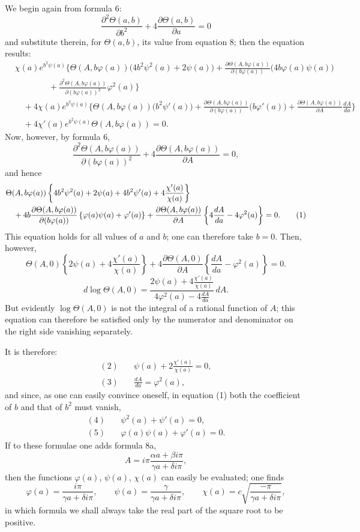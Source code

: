 \documentclass[10pt]{article}
\newcommand{\dd}{\partial}
\newcommand{\sourceanchor}[1]{\hypertarget{source-#1}{}}
\begin{document}
We begin again from formula 6:
\[
\frac{\dd^{2}\Theta(a,b)}{\dd b^{2}}+4\frac{\dd\Theta(a,b)}{\dd a}=0
\]
and substitute therein, for \(\Theta(a,b)\), its value from equation 8; then the equation results:
\begin{align*}
&\chi(a)e^{b^{2}\psi(a)}\Biggl\{\Theta(A,b\varphi(a))\bigl(4b^{2}\psi^{2}(a)+2\psi(a)\bigr)
+\frac{\dd\Theta(A,b\varphi(a))}{\dd(b\varphi(a))}\bigl(4b\varphi(a)\psi(a)\bigr)\\
&\qquad\qquad
+\frac{\dd^{2}\Theta(A,b\varphi(a))}{\dd(b\varphi(a))^{2}}\varphi^{2}(a)\Biggr\}\\
&\quad+4\chi(a)e^{b^{2}\psi(a)}\Biggl\{\Theta(A,b\varphi(a))\bigl(b^{2}\psi'(a)\bigr)
+\frac{\dd\Theta(A,b\varphi(a))}{\dd(b\varphi(a))}\bigl(b\varphi'(a)\bigr)
+\frac{\dd\Theta(A,b\varphi(a))}{\dd A}\frac{dA}{da}\Biggr\}\\
&\quad+4\chi'(a)e^{b^{2}\psi(a)}\Theta(A,b\varphi(a))=0.
\end{align*}
Now, however, by formula 6,
\[
\frac{\dd^{2}\Theta(A,b\varphi(a))}{\dd(b\varphi(a))^{2}}+4\frac{\dd\Theta(A,b\varphi(a))}{\dd A}=0,
\]
and hence
\sourceanchor{PA10}
\begin{align}
&\Theta(A,b\varphi(a))\left\{4b^{2}\psi^{2}(a)+2\psi(a)+4b^{2}\psi'(a)+4\frac{\chi'(a)}{\chi(a)}\right\} \notag\\
&\quad+4b\frac{\dd\Theta(A,b\varphi(a))}{\dd(b\varphi(a))}\left\{\varphi(a)\psi(a)+\varphi'(a)\right\}
+\frac{\dd\Theta(A,b\varphi(a))}{\dd A}\left\{4\frac{dA}{da}-4\varphi^{2}(a)\right\}=0. \tag{1}
\end{align}
This equation holds for all values of \(a\) and \(b\); one can therefore take \(b=0\). Then, however,
\[
\Theta(A,0)\left\{2\psi(a)+4\frac{\chi'(a)}{\chi(a)}\right\}+4\frac{\dd\Theta(A,0)}{\dd A}\left\{\frac{dA}{da}-\varphi^{2}(a)\right\}=0.
\]
\[
d\log\Theta(A,0)=\frac{2\psi(a)+4\frac{\chi'(a)}{\chi(a)}}{4\varphi^{2}(a)-4\frac{dA}{da}}\,dA.
\]
But evidently \(\log\Theta(A,0)\) is not the integral of a rational function of \(A\); this equation can therefore be satisfied only by the numerator and denominator on the right side vanishing separately.

It is therefore:
\begin{align*}
(2)\quad&\psi(a)+2\frac{\chi'(a)}{\chi(a)}=0,\\
(3)\quad&\frac{dA}{da}=\varphi^{2}(a),
\end{align*}
and since, as one can easily convince oneself, in equation (1) both the coefficient of \(b\) and that of \(b^{2}\) must vanish,
\begin{align*}
(4)\quad&\psi^{2}(a)+\psi'(a)=0,\\
(5)\quad&\varphi(a)\psi(a)+\varphi'(a)=0.
\end{align*}
If to these formulae one adds formula 8a,
\[
A=i\pi\frac{\alpha a+\beta i\pi}{\gamma a+\delta i\pi},
\]
then the functions \(\varphi(a)\), \(\psi(a)\), \(\chi(a)\) can easily be evaluated; one finds
\[
\varphi(a)=\frac{i\pi}{\gamma a+\delta i\pi},
\qquad
\psi(a)=\frac{\gamma}{\gamma a+\delta i\pi},
\qquad
\chi(a)=c\sqrt{\frac{-\pi}{\gamma a+\delta i\pi}},
\]
in which formula we shall always take the real part of the square root to be positive.
\end{document}
